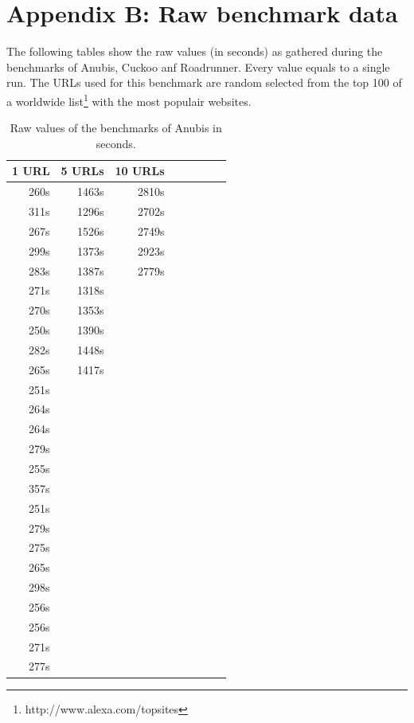 \documentclass{scrartcl}
\begin{document}
\clearpage

\section*{Appendix B: Raw benchmark data}

The following tables show the raw values (in seconds) as gathered during the benchmarks of Anubis, Cuckoo anf Roadrunner. Every value equals to a single run. The URLs used for this benchmark are random selected from the top 100 of a worldwide list\footnote{http://www.alexa.com/topsites} with the most populair websites.

\begin{table}[h]
\center
\begin{tabular}{@{}llllllll@{}}
\toprule
1 URL       & 5 URLs      & 10 URLs    \\ \midrule
\multicolumn{1}{r}{260s} & \multicolumn{1}{r}{1463s} & \multicolumn{1}{r}{2810s} \\
\multicolumn{1}{r}{311s} & \multicolumn{1}{r}{1296s} & \multicolumn{1}{r}{2702s} \\
\multicolumn{1}{r}{267s} & \multicolumn{1}{r}{1526s} & \multicolumn{1}{r}{2749s} \\
\multicolumn{1}{r}{299s} & \multicolumn{1}{r}{1373s} & \multicolumn{1}{r}{2923s} \\
\multicolumn{1}{r}{283s} & \multicolumn{1}{r}{1387s} & \multicolumn{1}{r}{2779s} \\
\multicolumn{1}{r}{271s} & \multicolumn{1}{r}{1318s} & \\
\multicolumn{1}{r}{270s} & \multicolumn{1}{r}{1353s} & \\
\multicolumn{1}{r}{250s} & \multicolumn{1}{r}{1390s} & \\
\multicolumn{1}{r}{282s} & \multicolumn{1}{r}{1448s} & \\
\multicolumn{1}{r}{265s} & \multicolumn{1}{r}{1417s} & \\
\multicolumn{1}{r}{251s} &  & \\
\multicolumn{1}{r}{264s} &  & \\
\multicolumn{1}{r}{264s} &  & \\
\multicolumn{1}{r}{279s} &  & \\
\multicolumn{1}{r}{255s} &  & \\
\multicolumn{1}{r}{357s} &  & \\
\multicolumn{1}{r}{251s} &  & \\
\multicolumn{1}{r}{279s} &  & \\
\multicolumn{1}{r}{275s} &  & \\
\multicolumn{1}{r}{265s} &  & \\
\multicolumn{1}{r}{298s} &  & \\
\multicolumn{1}{r}{256s} &  & \\
\multicolumn{1}{r}{256s} &  & \\
\multicolumn{1}{r}{271s} &  & \\
\multicolumn{1}{r}{277s} &  & \\ \bottomrule
\end{tabular}
\caption{Raw values of the benchmarks of Anubis in seconds.}
\label{rawdata_an}
\end{table}
\end{document}
